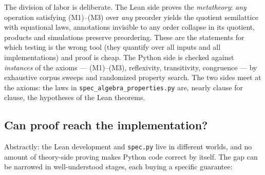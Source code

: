 \documentclass[11pt]{article}
\theoremstyle{definition}
\theoremstyle{remark}
\newcommand{\code}[1]{\texttt{#1}}
\begin{document}
The division of labor is deliberate.  The Lean side proves the
\emph{metatheory}: \emph{any} operation satisfying (M1)--(M3) over
\emph{any} preorder yields the quotient semilattice with equational laws,
annotations invisible to any order collapse in its quotient, products and
simulations preserve preordering.  These are the statements for which testing
is the wrong tool (they quantify over all inputs and all implementations)
and proof is cheap.  The Python side is checked against \emph{instances} of
the axioms --- (M1)--(M3), reflexivity, transitivity, congruence --- by
exhaustive corpus sweeps and randomized property search.  The two sides meet
at the axioms: the laws in \code{spec\_algebra\_properties.py} are, nearly
clause for clause, the hypotheses of the Lean theorems.

\subsection{Can proof reach the implementation?}\label{sec:bridge}

Abstractly: the Lean development and \code{spec.py} live in different worlds,
and no amount of theory-side proving makes Python code correct by itself.
The gap can be narrowed in well-understood stages, each buying a specific
guarantee:
\end{document}
